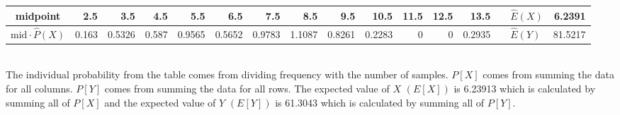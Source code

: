 \begin{table}[hb]
\begin{adjustbox}{width = \textwidth, center}
\begin{tabular}{|cc|r|r|r|r|r|r|r|r|r|r|r|r|r|r|r|}
            \multicolumn{2}{|c|}{\cellcolor[HTML]{FCE5CD}midpoint}                          & \cellcolor[HTML]{FCE5CD}2.5                    & \cellcolor[HTML]{FCE5CD}3.5                    & \cellcolor[HTML]{FCE5CD}4.5                    & \cellcolor[HTML]{FCE5CD}5.5                    & \cellcolor[HTML]{FCE5CD}6.5                    & \cellcolor[HTML]{FCE5CD}7.5                    & \cellcolor[HTML]{FCE5CD}8.5                    & \cellcolor[HTML]{FCE5CD}9.5                     & \cellcolor[HTML]{FCE5CD}10.5                    & \cellcolor[HTML]{FCE5CD}11.5                    & \cellcolor[HTML]{FCE5CD}12.5                    & \cellcolor[HTML]{FCE5CD}13.5                    & \multicolumn{1}{l|}{}                                                           & \multicolumn{1}{l|}{\cellcolor[HTML]{D9D9D9}$\widehat{E}(X)$}           & \cellcolor[HTML]{D9D9D9}6.2391                                                                   \\ \hline
            \multicolumn{2}{|c|}{\cellcolor[HTML]{FCE5CD}$\mathrm{mid}\cdot\widehat{P}(X)$} & \cellcolor[HTML]{FCE5CD}0.163                  & \cellcolor[HTML]{FCE5CD}0.5326                 & \cellcolor[HTML]{FCE5CD}0.587                  & \cellcolor[HTML]{FCE5CD}0.9565                 & \cellcolor[HTML]{FCE5CD}0.5652                 & \cellcolor[HTML]{FCE5CD}0.9783                 & \cellcolor[HTML]{FCE5CD}1.1087                 & \cellcolor[HTML]{FCE5CD}0.8261                  & \cellcolor[HTML]{FCE5CD}0.2283                  & \cellcolor[HTML]{FCE5CD}0                       & \cellcolor[HTML]{FCE5CD}0                       & \cellcolor[HTML]{FCE5CD}0.2935                  & \multicolumn{1}{l|}{}                                                           & \multicolumn{1}{l|}{\cellcolor[HTML]{D9D9D9}$\widehat{E}(Y)$}           & \cellcolor[HTML]{D9D9D9}81.5217                                                                  \\ \hline
        \end{tabular}
    \end{adjustbox}
\end{table}\\
The individual probability from the table comes from dividing frequency with the number of samples. $P[X]$ comes from summing the data for all columns. $P[Y]$ comes from summing the data for all rows. The expected value of $X$ $(E[X])$ is 6.23913 which is calculated by summing all of $P[X]$ and the expected value of $Y$ $(E[Y])$ is 61.3043 which is calculated by summing all of $P[Y]$.\\
